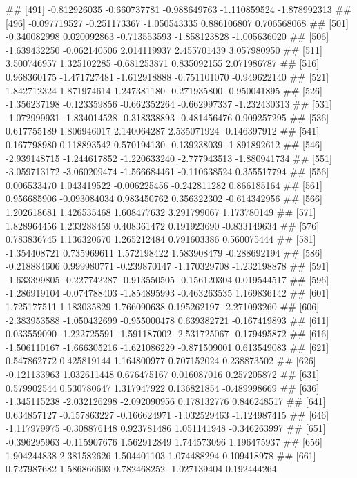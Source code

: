 \documentclass[
]{article}
\begin{document}
\begin{enumerate}[label=(\alph*)]
##  [491] -0.812926035 -0.660737781 -0.988649763 -1.110859524 -1.878992313
##  [496] -0.097719527 -0.251173367 -1.050543335  0.886106807  0.706568068
##  [501] -0.340082998  0.020092863 -0.713553593 -1.858123828 -1.005636020
##  [506] -1.639432250 -0.062140506  2.014119937  2.455701439  3.057980950
##  [511]  3.500746957  1.325102285 -0.681253871  0.835092155  2.071986787
##  [516]  0.968360175 -1.471727481 -1.612918888 -0.751101070 -0.949622140
##  [521]  1.842712324  1.871974614  1.247381180 -0.271935800 -0.950041895
##  [526] -1.356237198 -0.123359856 -0.662352264 -0.662997337 -1.232430313
##  [531] -1.072999931 -1.834014528 -0.318338893 -0.481456476  0.909257295
##  [536]  0.617755189  1.806946017  2.140064287  2.535071924 -0.146397912
##  [541]  0.167798980  0.118893542  0.570194130 -0.139238039 -1.891892612
##  [546] -2.939148715 -1.244617852 -1.220633240 -2.777943513 -1.880941734
##  [551] -3.059713172 -3.060209474 -1.566684461 -0.110638524  0.355517794
##  [556]  0.006533470  1.043419522 -0.006225456 -0.242811282  0.866185164
##  [561]  0.956685906 -0.093084034  0.983450762  0.356322302 -0.614342956
##  [566]  1.202618681  1.426535468  1.608477632  3.291799067  1.173780149
##  [571]  1.828964456  1.233288459  0.408361472  0.191923690 -0.833149634
##  [576]  0.783836745  1.136320670  1.265212484  0.791603386  0.560075444
##  [581] -1.354408721  0.735969611  1.572198422  1.583908479 -0.288692194
##  [586] -0.218884606  0.999980771 -0.239870147 -1.170329708 -1.232198878
##  [591] -1.633399805 -0.227742287 -0.913550505 -0.156120304  0.019544517
##  [596] -1.286919104 -0.074788403 -1.854895993 -0.463263535  1.169836142
##  [601]  1.725177511  1.183035829  1.766090638  0.195262197 -2.271093260
##  [606] -2.383953588 -1.050432699 -0.955000478  0.639382721 -0.167419893
##  [611]  0.033559090 -1.222725591 -1.591187002 -2.531725067 -0.179495872
##  [616] -1.506110167 -1.666305216 -1.621086229 -0.871509001  0.613549083
##  [621]  0.547862772  0.425819144  1.164800977  0.707152024  0.238873502
##  [626] -0.121133963  1.032611448  0.676475167  0.016087016  0.257205872
##  [631]  0.579902544  0.530780647  1.317947922  0.136821854 -0.489998669
##  [636] -1.345115238 -2.032126298 -2.092090956  0.178132776  0.846248517
##  [641]  0.634857127 -0.157863227 -0.166624971 -1.032529463 -1.124987415
##  [646] -1.117979975 -0.308876148  0.923781486  1.051141948 -0.346263997
##  [651] -0.396295963 -0.115907676  1.562912849  1.744573096  1.196475937
##  [656]  1.904244838  2.381582626  1.504401103  1.074488294  0.109418978
##  [661]  0.727987682  1.586866693  0.782468252 -1.027139404  0.192444264

\end{enumerate}
\end{document}

